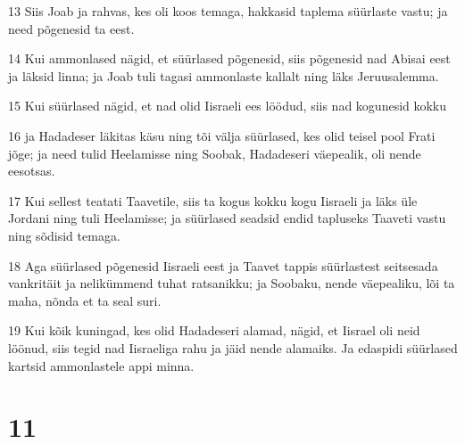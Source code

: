 \par 13 Siis Joab ja rahvas, kes oli koos temaga, hakkasid taplema süürlaste vastu; ja need põgenesid ta eest.
\par 14 Kui ammonlased nägid, et süürlased põgenesid, siis põgenesid nad Abisai eest ja läksid linna; ja Joab tuli tagasi ammonlaste kallalt ning läks Jeruusalemma.
\par 15 Kui süürlased nägid, et nad olid Iisraeli ees löödud, siis nad kogunesid kokku
\par 16 ja Hadadeser läkitas käsu ning tõi välja süürlased, kes olid teisel pool Frati jõge; ja need tulid Heelamisse ning Soobak, Hadadeseri väepealik, oli nende eesotsas.
\par 17 Kui sellest teatati Taavetile, siis ta kogus kokku kogu Iisraeli ja läks üle Jordani ning tuli Heelamisse; ja süürlased seadsid endid tapluseks Taaveti vastu ning sõdisid temaga.
\par 18 Aga süürlased põgenesid Iisraeli eest ja Taavet tappis süürlastest seitsesada vankritäit ja nelikümmend tuhat ratsanikku; ja Soobaku, nende väepealiku, lõi ta maha, nõnda et ta seal suri.
\par 19 Kui kõik kuningad, kes olid Hadadeseri alamad, nägid, et Iisrael oli neid löönud, siis tegid nad Iisraeliga rahu ja jäid nende alamaiks. Ja edaspidi süürlased kartsid ammonlastele appi minna.

\chapter{11}


